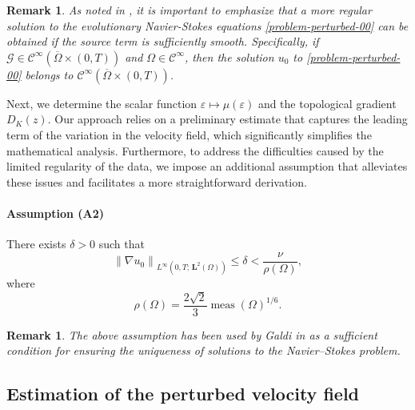 \documentclass[a4paper,12pt,reqno,natbib]{amsart}
\newtheorem{remark}[theorem]{Remark}
\def\L{\textbf{L}}
\begin{document}
\begin{remark}\label{regularity}
As noted in \cite[Remark 3.8, p. 247]{TemamBook1977}, it is important to emphasize that a more regular solution to the evolutionary Navier-Stokes equations \eqref{problem-perturbed-00} can be obtained if the source term is sufficiently smooth. Specifically, if \( \mathcal{G} \in \mathcal{C}^\infty(\overline{\Omega} \times (0, T)) \) and \( \Omega \in\mathcal{C}^\infty \), then the solution \( u_0 \) to \eqref{problem-perturbed-00} belongs to \( \mathcal{C}^\infty(\overline{\Omega} \times (0, T)) \).
\end{remark}

Next, we determine the scalar function \( \varepsilon \mapsto \mu(\varepsilon) \) and the topological gradient \( D_K(z) \). Our approach relies on a preliminary estimate that captures the leading term of the variation in the velocity field, which significantly simplifies the mathematical analysis. Furthermore, to address the difficulties caused by the limited regularity of the data, we impose an additional assumption that alleviates these issues and facilitates a more straightforward derivation.

\vspace{0.3cm}
\paragraph{\bf Assumption (A2)} There exists \( \delta > 0 \) such that 
    \begin{equation}\label{condition-u0}
    \left\|\nabla u_0\right\|_{L^\infty(0,T;\,\L^2(\Omega))} \leq \delta < \frac{\nu}{\rho(\Omega)},
    \end{equation}
    where \begin{equation}\label{uni-con11}
        \rho(\Omega) = \displaystyle \frac{2\sqrt{2}}{3} \operatorname{meas}(\Omega)^{1/6} .
        \end{equation}


\begin{remark}\label{remark-smoothness}
The above assumption has been used by Galdi in \cite{galdi2011introduction} as a sufficient condition for ensuring the uniqueness of solutions to the Navier–Stokes problem.
\end{remark}



\subsection{Estimation of the perturbed velocity field}
\end{document}
